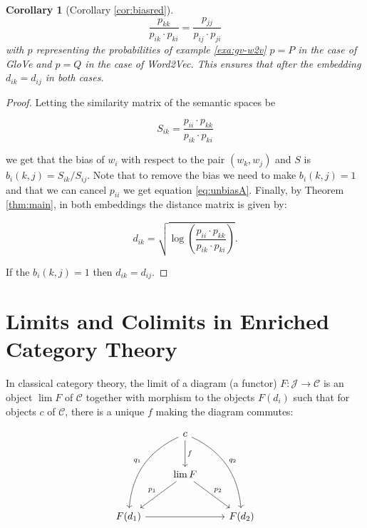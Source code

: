 \documentclass[10pt,a4paper]{elsarticle}
\newcommand{\C}{\mathcal{C}}
\newcommand{\J}{\mathcal{J}}
\newtheorem{cor}[theorem]{Corollary}
\begin{document}
{\begin{cor}[Corollary \ref{cor:biasred}]
		
		\begin{equation}\label{eq:unbiasA}
			\frac{p_{kk}}{p_{ik}\cdot p_{ki}} = \frac{p_{jj}}{p_{ij}\cdot p_{ji}}
		\end{equation}
		with $p$ representing the probabilities of example \ref{exa:gv-w2v} $p=P$ in the case of GloVe and $p=Q$ in the case of Word2Vec. This ensures that after the embedding $d_{ik}=d_{ij}$ in both cases.
		
	\end{cor}
	
	
	\begin{proof}
		Letting the similarity matrix of the semantic spaces be
		
		
		\begin{equation}
			S_{ik} =\frac{p_{ii}\cdot p_{kk}}{p_{ik}\cdot p_{ki}}
		\end{equation} 
		
		we get that the bias of $w_{i}$ with respect to the pair $(w_{k},w_{j})$ and $S$ is $b_{i}(k,j)=S_{ik}/S_{ij}$. Note that to remove the bias we need to make $b_{i}(k,j)=1$ and that we can cancel $p_{ii}$ we get equation \eqref{eq:unbiasA}. Finally, by Theorem \ref{thm:main}, in both embeddings the distance matrix is given by:
		
		\begin{equation*}
			d_{ik}=\sqrt{\log\left(\frac{p_{ii}\cdot p_{kk}}{p_{ik}\cdot p_{ki}}\right)}.
		\end{equation*}
		
		If the $b_{i}(k,j)=1$ then $d_{ik}=d_{ij}$.
		
	\end{proof}
	
	\section{Limits and Colimits in Enriched Category Theory}\label{sec:AppendixB}
	
	In classical category theory, the limit of a diagram (a functor) $F\colon \J\to \C$ is an object $\lim F$ of $\C$  together with morphism to the objects $F(d_i)$ such that for objects $c$ of $\C$, there is a unique $f$ making the diagram commutes:
	
	\[\label{fig:limit}
	\begin{tikzcd}[row sep = large]
		& c \arrow[d, "f"] \arrow[ddr, bend left,"q_2"]   \arrow[ddl, bend right,"q_1",swap] & \\
		& \lim F \arrow[dr, "p_2"]  \arrow[dl,swap, "p_1"] & \\
		F(d_1) \arrow[rr,swap] & &  F(d_2) 
	\end{tikzcd}
	\]
	
}
\end{document}
